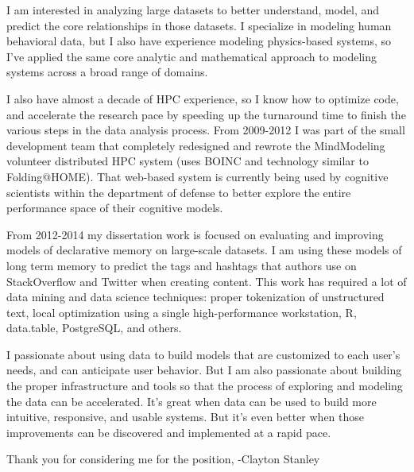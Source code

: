 \documentclass{article}
\begin{document}
I am interested in analyzing large datasets to better understand, model, and predict the core relationships in those datasets.
I specialize in modeling human behavioral data, but I also have experience modeling physics-based systems,
so I've applied the same core analytic and mathematical approach to modeling systems across a broad range of domains.

I also have almost a decade of HPC experience, so I know how to optimize code, and accelerate the research pace by speeding up the turnaround time to finish the various steps in the data analysis process. 
From 2009-2012 I was part of the small development team that completely redesigned and rewrote the MindModeling volunteer distributed HPC system (uses BOINC and technology similar to Folding@HOME).
That web-based system is currently being used by cognitive scientists within the department of defense to better explore the entire performance space of their cognitive models.

From 2012-2014 my dissertation work is focused on evaluating and improving models of declarative memory on large-scale datasets.
I am using these models of long term memory to predict the tags and hashtags that authors use on StackOverflow and Twitter when creating content.
This work has required a lot of data mining and data science techniques: proper tokenization of unstructured text, local optimization using a single high-performance workstation, R, data.table, PostgreSQL, and others.

I passionate about using data to build models that are customized to each user's needs, and can anticipate user behavior.
But I am also passionate about building the proper infrastructure and tools so that the process of exploring and modeling the data can be accelerated.
It's great when data can be used to build more intuitive, responsive, and usable systems.
But it's even better when those improvements can be discovered and implemented at a rapid pace.

Thank you for considering me for the position,
-Clayton Stanley
\end{document}
